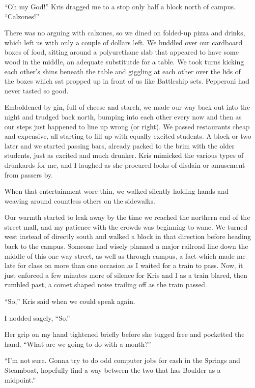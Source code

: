 ``Oh my God!''  Kris dragged me to a stop only half a block north of campus.  ``Calzones!''

There was no arguing with calzones, so we dined on folded-up pizza and drinks, which left us with only a couple of dollars left.  We huddled over our cardboard boxes of food, sitting around a polyurethane slab that appeared to have some wood in the middle, an adequate substitutde for a table.  We took turns kicking each other's shins beneath the table and giggling at each other over the lids of the boxes which sat propped up in front of us like Battleship sets.  Pepperoni had never tasted so good.

Emboldened by gin, full of cheese and starch, we made our way back out into the night and trudged back north, bumping into each other every now and then as our steps just happened to line up wrong (or right).  We passed restaurants cheap and expensive, all starting to fill up with equally excited students.  A block or two later and we started passing bars, already packed to the brim with the older students, just as excited and much drunker.  Kris mimicked the various types of drunkards for me, and I laughed as she procured looks of disdain or amusement from passers by.

When that entertainment wore thin, we walked silently holding hands and weaving around countless others on the sidewalks.

Our warmth started to leak away by the time we reached the northern end of the street mall, and my patience with the crowds was beginning to wane.  We turned west instead of directly south and walked a block in that direction before heading back to the campus.  Someone had wisely planned a major railroad line down the middle of this one way street, as well as through campus, a fact which made me late for class on more than one occasion as I waited for a train to pass.  Now, it just enforced a few minutes more of silence for Kris and I as a train blared, then rumbled past, a comet shaped noise trailing off as the train passed.

``So,'' Kris said when we could speak again.

I nodded sagely, ``So.''

Her grip on my hand tightened briefly before she tugged free and pocketted the hand.  ``What are we going to do with a month?''

``I'm not sure.  Gonna try to do odd computer jobs for cash in the Springs and Steamboat, hopefully find a way between the two that has Boulder as a midpoint.''

